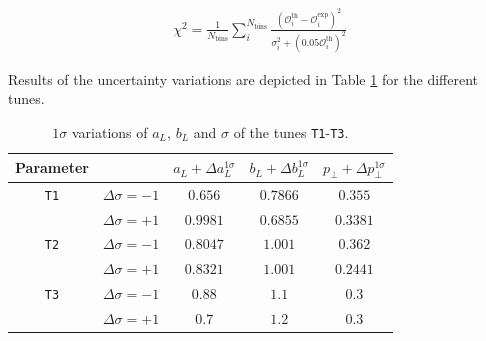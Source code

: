 \documentclass[aps,preprint,floatfix,nofootinbib,showpacs]{revtex4-1}
\begin{document}
\begin{eqnarray}
 \chi^2 = \frac{1}{N_\textrm{bins}} \sum_i^{N_\textrm{bins}} \frac{(\mathcal{O}_i^\textrm{th} - \mathcal{O}_i^\textrm{exp})^2}
 {\sigma^2_i + (0.05  \mathcal{O}_i^\textrm{th})^2}
 \label{chi2}
\end{eqnarray}

Results of the uncertainty variations are depicted in Table \ref{Table.variations1}
for the different tunes.


\begin{table}[!h]
 \begin{center}
 \begin{tabular}{ c | c | c | c | c  }
 \hline \hline
  Parameter   & & \hspace{0.4cm} $a_L + \Delta a_L^{1\sigma}$ \hspace{0.4cm}   & \hspace{0.4cm} $b_L + \Delta b_L^{1\sigma}$ \hspace{0.4cm} & \hspace{0.4cm} $p_\perp + \Delta p_\perp^{1\sigma}$ \hspace{0.4cm} \\ \hline \hline
  \texttt{T1} & $\Delta\sigma=-1$ \hspace{0.5cm}  & $0.656$   & $0.7866$  & $0.355$ \\ 
              & $\Delta\sigma=+1$ \hspace{0.5cm}  & $0.9981$  & $0.6855$ & $0.3381$ \\ \hline \hline
  \texttt{T2} & $\Delta\sigma=-1$ \hspace{0.5cm}  & $0.8047$  & $1.001$ & $0.362$ \\ 
              & $\Delta\sigma=+1$ \hspace{0.5cm}  & $0.8321$   & $1.001$ & $0.2441$ \\ \hline \hline
  \texttt{T3} & $\Delta\sigma=-1$ \hspace{0.5cm}  &  $0.88$   &  $1.1$   &  $0.3$  \\
              & $\Delta\sigma=+1$ \hspace{0.5cm}  &  $0.7$    &  $1.2$   &   $0.3$  \\ \hline \hline
 \end{tabular}
 \end{center}
 \caption{$1\sigma$ variations of $a_L$, $b_L$ and $\sigma$ of the tunes \texttt{T1}-\texttt{T3}.}
 \label{Table.variations1}
\end{table}
\clearpage
\end{document}
